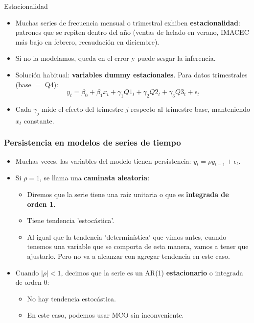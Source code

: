 \documentclass{beamer}
\begin{document}
\begin{frame}{Estacionalidad}

\begin{itemize}
  \item Muchas series de frecuencia mensual o trimestral exhiben \textbf{estacionalidad}: patrones que se repiten dentro del año (ventas de helado en verano, IMACEC más bajo en febrero, recaudación en diciembre).
  \item Si no la modelamos, queda en el error y puede sesgar la inferencia.
  \item Solución habitual: \textbf{variables dummy estacionales}. Para datos trimestrales (base $=$ Q4):
  \[
  y_t = \beta_0 + \beta_1 x_t + \gamma_1 Q1_t + \gamma_2 Q2_t + \gamma_3 Q3_t + \epsilon_t
  \]
  \item Cada $\gamma_j$ mide el efecto del trimestre $j$ respecto al trimestre base, manteniendo $x_t$ constante.
\end{itemize}

\end{frame}

\begin{frame}
\frametitle{Persistencia en modelos de series de tiempo}

\begin{itemize}
  \item Muchas veces, las variables del modelo tienen persistencia: $ y_t = \rho y_{t-1} + \epsilon_t $.
  \item Si \(\rho = 1\), se llama una \textbf{caminata aleatoria}:
  \begin{itemize}
    \item Diremos que la serie tiene una raíz unitaria o que es \textbf{integrada de orden 1.}
    \item Tiene tendencia 'estocástica'.
    \item Al igual que la tendencia 'determinística' que vimos antes, cuando tenemos una variable que se comporta de esta manera, vamos a tener que ajustarlo. Pero no va a alcanzar con agregar tendencia en este caso.
  \end{itemize}
  \item Cuando \(|\rho| < 1\), decimos que la serie es un AR(1) \textbf{estacionario} o integrada de orden 0:
  \begin{itemize}
    \item No hay tendencia estocástica.
    \item En este caso, podemos usar MCO sin inconveniente.
  \end{itemize}
\end{itemize}

\end{frame}
\end{document}
